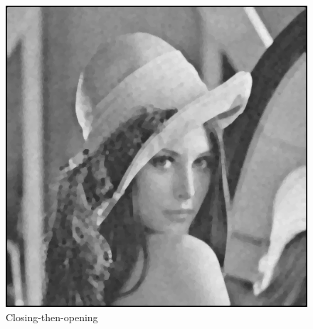 \documentclass{article}
\begin{document}
\begin{figure}[H]
  \includegraphics[width=\linewidth]{img/g10_close_then_open.png}
  \caption{Closing-then-opening}\label{fig:g10_close_then_open}
\endminipage\hfill
\end{figure}
\end{document}
